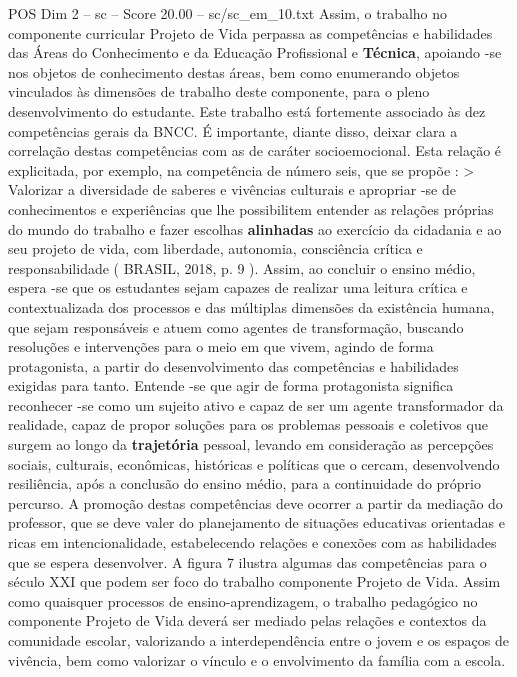 \begin{textsample}{POS Dim 2 – sc – Score 20.00 – sc/sc\_em\_10.txt}
Assim, o trabalho no componente curricular Projeto de Vida perpassa as competências e habilidades das Áreas do Conhecimento e da Educação Profissional e \textbf{Técnica}, apoiando -se nos objetos de conhecimento destas áreas, bem como enumerando objetos vinculados às dimensões de trabalho deste componente, para o pleno desenvolvimento do estudante.
Este trabalho está fortemente associado às dez competências gerais da BNCC.
É importante, diante disso, deixar clara a correlação destas competências com as de caráter socioemocional.
Esta relação é explicitada, por exemplo, na competência de número seis, que se propõe : > Valorizar a diversidade de saberes e vivências culturais e apropriar -se de conhecimentos e experiências que lhe possibilitem entender as relações próprias do mundo do trabalho e fazer escolhas \textbf{alinhadas} ao exercício da cidadania e ao seu projeto de vida, com liberdade, autonomia, consciência crítica e responsabilidade ( BRASIL, 2018, p. 9 ).
Assim, ao concluir o ensino médio, espera -se que os estudantes sejam capazes de realizar uma leitura crítica e contextualizada dos processos e das múltiplas dimensões da existência humana, que sejam responsáveis e atuem como agentes de transformação, buscando resoluções e intervenções para o meio em que vivem, agindo de forma protagonista, a partir do desenvolvimento das competências e habilidades exigidas para tanto.
Entende -se que agir de forma protagonista significa reconhecer -se como um sujeito ativo e capaz de ser um agente transformador da realidade, capaz de propor soluções para os problemas pessoais e coletivos que surgem ao longo da \textbf{trajetória} pessoal, levando em consideração as percepções sociais, culturais, econômicas, históricas e políticas que o cercam, desenvolvendo resiliência, após a conclusão do ensino médio, para a continuidade do próprio percurso.
A promoção destas competências deve ocorrer a partir da mediação do professor, que se deve valer do planejamento de situações educativas orientadas e ricas em intencionalidade, estabelecendo relações e conexões com as habilidades que se espera desenvolver.
A figura 7 ilustra algumas das competências para o século XXI que podem ser foco do trabalho componente Projeto de Vida.
Assim como quaisquer processos de ensino-aprendizagem, o trabalho pedagógico no componente Projeto de Vida deverá ser mediado pelas relações e contextos da comunidade escolar, valorizando a interdependência entre o jovem e os espaços de vivência, bem como valorizar o vínculo e o envolvimento da família com a escola.

\end{textsample}
